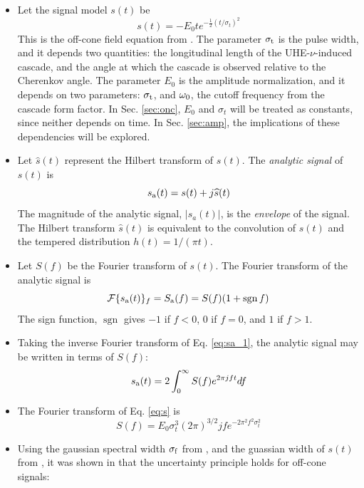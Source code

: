 \documentclass[amsmath,amssymb,aps,prd,10pt,twocolumn,showkeys]{revtex4}
\DeclareMathOperator{\sgn}{sgn}
\begin{document}
\begin{itemize}
\item Let the signal model $s(t)$ be
\begin{equation}
s(t) = -E_0 t e^{-\frac{1}{2}\left(t/\sigma_t\right)^2} \label{eq:s}
\end{equation}
This is the off-cone field equation from \cite{PhysRevD.105.123019}.  The parameter $\sigma_{\rm t}$ is the pulse width, and it depends two quantities: the longitudinal length of the UHE-$\nu$-induced cascade, and the angle at which the cascade is observed relative to the Cherenkov angle.  The parameter $E_0$ is the amplitude normalization, and it depends on two parameters: $\sigma_{\rm t}$, and $\omega_{\rm 0}$, the cutoff frequency from the cascade form factor.  In Sec. \ref{sec:onc}, $E_0$ and $\sigma_t$ will be treated as constants, since neither depends on time.  In Sec. \ref{sec:amp}, the implications of these dependencies will be explored.
\item Let $\widehat{s}(t)$ represent the Hilbert transform of $s(t)$.  The \textit{analytic signal} of $s(t)$ is
\begin{equation}
s_{\rm a}(t) = s(t) + j \widehat{s}(t)
\end{equation}
The magnitude of the analytic signal, $|s_a(t)|$, is the \textit{envelope} of the signal.  The Hilbert transform $\widehat{s}(t)$ is equivalent to the convolution of $s(t)$ and the tempered distribution $h(t) = 1/(\pi t)$.
\item Let $S(f)$ be the Fourier transform of $s(t)$.  The Fourier transform of the analytic signal is
\begin{equation}
\mathcal{F}\lbrace s_{\rm a}(t) \rbrace_{f} = S_{\rm a}(f) = S(f)(1+\sgn{f}) \label{eq:sa_1}
\end{equation}
The sign function, $\sgn$ gives $-1$ if $f<0$, $0$ if $f=0$, and $1$ if $f>1$.
\item Taking the inverse Fourier transform of Eq. \ref{eq:sa_1}, the analytic signal may be written in terms of $S(f)$:
\begin{equation}
s_{\rm a}(t) = 2\int_{0}^{\infty} S(f) e^{2\pi j f t} df \label{eq:sa_2}
\end{equation}
\item The Fourier transform of Eq. \ref{eq:s} is
\begin{equation}
S(f) = E_0 \sigma_t^3 (2\pi)^{3/2} j f e^{-2\pi^2 f^2 \sigma_t^2}
\end{equation}
\item Using the gaussian spectral width $\sigma_{\rm f}$ from \cite{10.1016/j.astropartphys.2017.03.008}, and the guassian width of $s(t)$ from \cite{PhysRevD.105.123019}, it was shown in \cite{PhysRevD.105.123019} that the uncertainty principle holds for off-cone signals:

\end{itemize}
\end{document}
